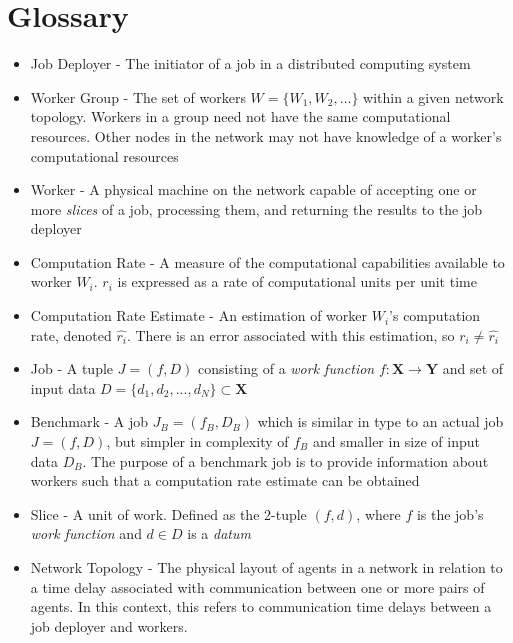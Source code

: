 \documentclass{article}
\begin{document}
\section{Glossary}

\begin{itemize}
    \item Job Deployer - The initiator of a job in a distributed computing system
    \item Worker Group - The set of workers $W = \{W_1, W_2, ...\}$ within a given network topology. Workers in a group need not have the same computational resources. Other nodes in the network may not have knowledge of a worker's computational resources
    \item Worker - A physical machine on the network capable of accepting one or more \textit{slices} of a job, processing them, and returning the results to the job deployer
    \item Computation Rate - A measure of the computational capabilities available to worker $W_i$. $r_i$ is expressed as a rate of computational units per unit time
    \item Computation Rate Estimate - An estimation of worker $W_i$'s computation rate, denoted $\hat{r_i}$. There is an error associated with this estimation, so $r_i \neq \hat{r_i}$
    \item Job - A tuple $J = (f, D)$ consisting of a \textit{work function} $f: \mathbf{X} \rightarrow \mathbf{Y}$ and set of input data $D = \{d_1, d_2, ..., d_N\} \subset \mathbf{X}$
    \item Benchmark - A job $J_B = (f_B, D_B)$ which is similar in type to an actual job $J = (f, D)$, but simpler in complexity of $f_B$ and smaller in size of input data $D_B$. The purpose of a benchmark job is to provide information about workers such that a computation rate estimate can be obtained
    \item Slice - A unit of work. Defined as the 2-tuple $(f, d)$, where $f$ is the job's \textit{work function} and $d \in D$ is a \textit{datum}
    \item Network Topology - The physical layout of agents in a network in relation to a time delay associated with communication between one or more pairs of agents. In this context, this refers to communication time delays between a job deployer and workers.

\end{itemize}
\end{document}
